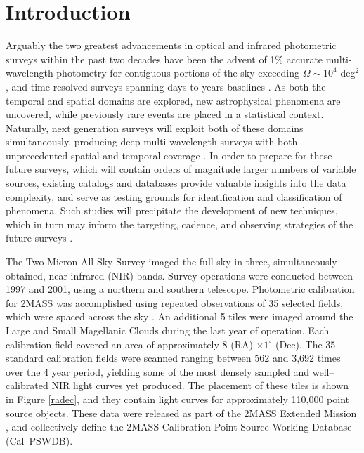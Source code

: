 \documentclass[]{emulateapj}
\begin{document}


\section{Introduction}
Arguably the two greatest advancements in optical and infrared photometric surveys within the past two decades have been the advent of 1\% accurate multi-wavelength photometry for contiguous portions of the sky exceeding $\Omega\sim10^4$ deg$^2$ \citep[e.g.][]{2006AJ....131.1163S,2010AJ....140.1868W,2011ApJS..193...29A}, and time resolved surveys spanning days to years baselines \citep[e.g.][]{2007AJ....134..973I,2011AJ....142..190S}. As both the temporal and spatial domains are explored, new astrophysical phenomena are uncovered, while previously rare events are placed in a statistical context. Naturally, next generation surveys will exploit both of these domains simultaneously, producing deep multi-wavelength surveys with both unprecedented spatial and temporal coverage \citep{2002SPIE.4836..154K,2008arXiv0805.2366I}. In order to prepare for these future surveys, which will contain orders of magnitude larger numbers of variable sources, existing catalogs and databases provide valuable insights into the data complexity, and serve as testing grounds for identification and classification of phenomena. Such studies will precipitate the development of new techniques, which in turn may inform the targeting, cadence, and observing strategies of the future surveys \cite[e.g.][]{2012AJ....144....9O}.


The Two Micron All Sky Survey \citep[2MASS;][]{2006AJ....131.1163S} imaged the full sky in three, simultaneously obtained, near-infrared (NIR) bands. Survey operations were conducted between 1997 and 2001, using a northern and southern telescope. Photometric calibration for 2MASS was accomplished using repeated observations of 35 selected fields, which were spaced across the sky \citep{2000AJ....120.3340N}. An additional 5 tiles were imaged around the Large and Small Magellanic Clouds during the last year of operation. Each calibration field covered an area of approximately 8 (RA) $\times 1^\circ$ (Dec). The 35 standard calibration fields were scanned ranging between 562 and 3,692 times over the 4 year period, yielding some of the most densely sampled and well--calibrated NIR light curves yet produced. The placement of these tiles is shown in Figure \ref{radec}, and they contain light curves for approximately 110,000 point source objects.  These data were released as part of the 2MASS Extended Mission \citep{Cutri-2massExtended}, and collectively define the 2MASS Calibration Point Source Working Database (Cal--PSWDB).
\end{document}
